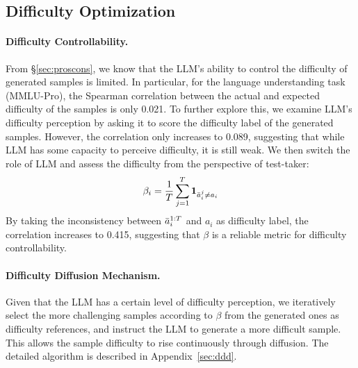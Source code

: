 \subsection{Difficulty Optimization}
\label{sec:diff_bound_opt}
\paragraph{Difficulty Controllability.} From \S\ref{sec:proscons}, we know that the LLM's ability to control the difficulty of generated samples is limited. In particular, for the language understanding task (MMLU-Pro), the Spearman correlation between the actual and expected difficulty of the samples is only 0.021. To further explore this, we examine LLM’s difficulty perception by asking it to score the difficulty label of the generated samples. However, the correlation only increases to 0.089, suggesting that while LLM has some capacity to perceive difficulty, it is still weak. We then switch the role of LLM and assess the difficulty from the perspective of test-taker:
\begin{equation}
    \beta_i = \frac{1}{T} \sum_{j=1}^T \textbf{1}_{\Bar{a}_i^j\neq a_i}
\end{equation}
By taking the inconsistency between $\Bar{a}_i^{1:T}$ and $a_i$ as difficulty label, the correlation increases to 0.415, suggesting that $\beta$ is a reliable metric for difficulty controllability.


\paragraph{Difficulty Diffusion Mechanism.} 
Given that the LLM has a certain level of difficulty perception, we iteratively select the more challenging samples according to $\beta$ from the generated ones as difficulty references, and instruct the LLM to generate a more difficult sample. This allows the sample difficulty to rise continuously through diffusion. The detailed algorithm is described in Appendix~\ref{sec:ddd}. 
